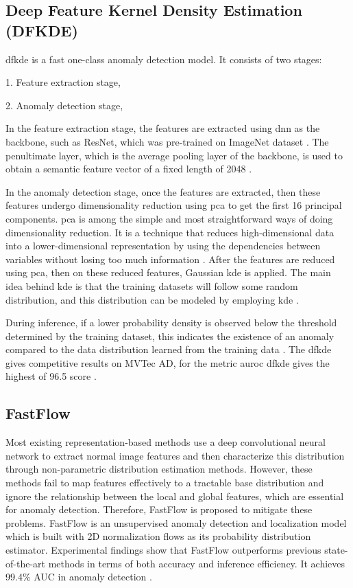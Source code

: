 \subsection{Deep Feature Kernel Density Estimation (DFKDE)}
\label{subsec:dfkde}

\gls{dfkde} is a fast one-class anomaly detection model. It consists of two stages:

1. Feature extraction stage,

2. Anomaly detection stage,

In the feature extraction stage, the features are extracted using \gls{dnn} as the backbone, such as ResNet, which was pre-trained on ImageNet\cite{5206848} dataset \cite{10208786}. The penultimate layer, which is the average pooling layer of the backbone, is used to obtain a semantic feature vector of a fixed length of 2048 \cite{Anomalib2024}.

In the anomaly detection stage, once the features are extracted, then these features undergo dimensionality reduction using \gls{pca}\cite{IBM2023} to get the first 16 principal components. \gls{pca} is among the simple and most straightforward ways of doing dimensionality reduction. It is a technique that reduces high-dimensional data into a lower-dimensional representation by using the dependencies between variables without losing too much information \cite{Shalizi2012}. After the features are reduced using \gls{pca}, then on these reduced features, Gaussian \gls{kde} is applied. The main idea behind \gls{kde} is that the training datasets will follow some random distribution, and this distribution can be modeled by employing \gls{kde} \cite{10208786}.

During inference, if a lower probability density is observed below the threshold determined by the training dataset, this indicates the existence of an anomaly compared to the data distribution learned from the training data \cite{10208786}. The \gls{dfkde} gives competitive results on MVTec AD\cite{8954181}, for the metric \gls{auroc} \gls{dfkde} gives the highest of 96.5 score \cite{Anomalib2024}.

\subsection{FastFlow}
\label{subsec:fastflow}

Most existing representation-based methods use a deep convolutional neural network to extract normal image features and then characterize this distribution through non-parametric distribution estimation methods. However, these methods fail to map features effectively to a tractable base distribution and ignore the relationship between the local and global features, which are essential for anomaly detection. Therefore, FastFlow is proposed to mitigate these problems. FastFlow is an unsupervised anomaly detection and localization model which is built with 2D normalization flows as its probability distribution estimator. Experimental findings show that FastFlow outperforms previous state-of-the-art methods in terms of both accuracy and inference efficiency. It achieves 99.4\% AUC in anomaly detection \cite{yu2021fastflowunsupervisedanomalydetection}.

